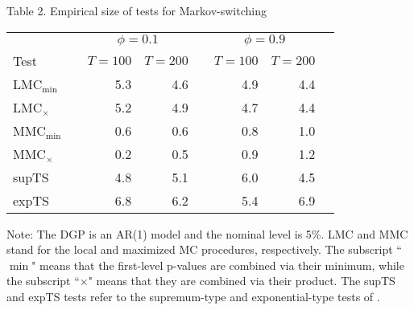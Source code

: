 \documentclass[11pt]{article}
\begin{document}
\begin{table}[p]
\begin{center}
Table 2. Empirical size of tests for Markov-switching \medskip
\par
\begin{tabular}{lrrrrrrr}
\hline\hline
&  & \multicolumn{2}{c}{$\phi=0.1$} &  & \multicolumn{2}{c}{$\phi=0.9$} & 
\\ \cline{3-4}\cline{6-7}
Test &  & $T=100$ & $T=200$ &  & $T=100$ & $T=200$ &  \\ \hline
LMC$_{\min}$ &  & 5.3 & 4.6 &  & 4.9 & 4.4 &  \\ 
LMC$_{\times}$ &  & 5.2 & 4.9 &  & 4.7 & 4.4 &  \\ 
MMC$_{\min}$ &  & 0.6 & 0.6 &  & 0.8 & 1.0 &  \\ 
MMC$_{\times}$ &  & 0.2 & 0.5 &  & 0.9 & 1.2 &  \\ 
supTS &  & 4.8 & 5.1 &  & 6.0 & 4.5 &  \\ 
expTS &  & 6.8 & 6.2 &  & 5.4 & 6.9 &  \\ \hline\hline
\end{tabular}%
\end{center}
\par
Note: The DGP is an AR(1) model and the nominal level is 5\%. LMC and MMC
stand for the local and maximized MC procedures, respectively. The subscript
``$\min$" means that the first-level p-values are combined via their
minimum, while the subscript ``$\times$" means that they are combined via
their product. The supTS and expTS tests refer to the supremum-type and
exponential-type tests of \citet{Carrasco-Hu-Ploberger:2014}.
\end{table}
\end{document}
